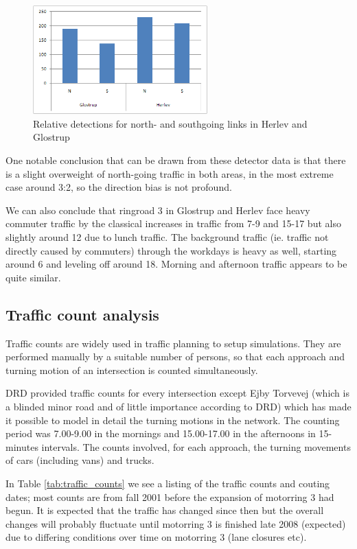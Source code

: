 \begin{figure}[htbp]
\centering
\includegraphics[width=0.6\textwidth]{detector_directions.png}
\caption{Relative detections for north- and southgoing links in Herlev and Glostrup}
\label{fig:detector_directions}
\end{figure}

One notable conclusion that can be drawn from these detector data is that there is a slight overweight of north-going traffic in both areas, in the most extreme case around 3:2, so the direction bias is not profound.

We can also conclude that ringroad 3 in Glostrup and Herlev face heavy commuter traffic by the classical increases in traffic from 7-9 and 15-17 but also slightly around 12 due to lunch traffic. The background traffic (ie. traffic not directly caused by commuters) through the workdays is heavy as well, starting around 6 and leveling off around 18. Morning and afternoon traffic appears to be quite similar.

\subsection{Traffic count analysis}
\label{traffic_count_analysis}

Traffic counts are widely used in traffic planning to setup simulations. They are performed manually by a suitable number of persons, so that each approach and turning motion of an intersection is counted simultaneously.

DRD provided traffic counts for every intersection except Ejby Torvevej (which is a blinded minor road and of little importance according to DRD) which has made it possible to model in detail the turning motions in the network.
The counting period was 7.00-9.00 in the mornings and 15.00-17.00 in the afternoons in 15-minutes intervals. The counts involved, for each approach, the turning movements of cars (including vans) and trucks. 

In Table \ref{tab:traffic_counts} we see a listing of the traffic counts and couting dates; most counts are from fall 2001 before the expansion of motorring 3 had begun. It is expected that the traffic has changed since then but the overall changes will probably fluctuate until motorring 3 is finished late 2008 (expected) due to differing conditions over time on motorring 3 (lane closures etc).

